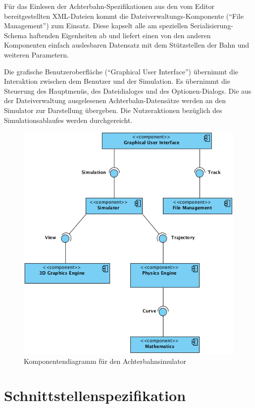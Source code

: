 Für das Einlesen der Achterbahn-Spezifikationen aus den vom Editor bereitgestellten
XML-Dateien kommt die Dateiverwaltungs-Komponente (``File Management'') zum Einsatz. Diese kapselt alle
am speziellen Serialisierung-Schema haftenden Eigenheiten ab und liefert einen
von den anderen Komponenten einfach auslesbaren Datensatz mit dem Stützstellen der
Bahn und weiteren Parametern.

Die grafische Benutzeroberfläche (``Graphical User Interface'') übernimmt die Interaktion zwischen dem Benutzer und
der Simulation. Es übernimmt die Steuerung des Hauptmenüs, des Dateidialoges und
des Optionen-Dialogs. Die aus der Dateiverwaltung ausgelesenen Achterbahn-Datensätze 
werden an den Simulator zur Darstellung übergeben. Die Nutzeraktionen bezüglich des
Simulationsablaufes werden durchgereicht.

\begin{figure}
\includegraphics[width=\linewidth]{bilder/component_overview}
\caption{Komponentendiagramm für den Achterbahnsimulator}
\label{labelname}
\end{figure}

\section{Schnittstellenspezifikation}

